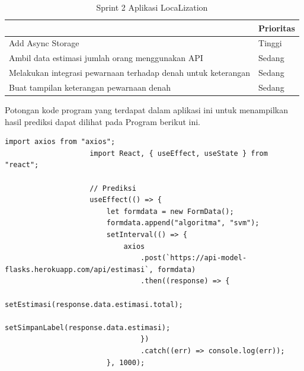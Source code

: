 \begin{enumerate}[1.]
	      \begin{table}[H]
		      \centering
		      \caption{Sprint 2 Aplikasi LocaLization}
		      \label{LocaLization-sprint-2}
		      \begin{tabular}{|l|l|}
			      \hline
			      \rowcolor[HTML]{CBCEFB}
			      \multicolumn{1}{|c|}{\cellcolor[HTML]{CBCEFB}Item}            & \multicolumn{1}{c|}{\cellcolor[HTML]{CBCEFB}Prioritas} \\ \hline
			      Add Async Storage                                             & Tinggi                                                 \\ \hline
			      Ambil data estimasi jumlah orang menggunakan API              & Sedang                                                 \\ \hline
			      Melakukan integrasi pewarnaan terhadap denah untuk keterangan & Sedang                                                 \\ \hline
			      Buat tampilan keterangan pewarnaan denah                      & Sedang                                                 \\ \hline
		      \end{tabular}
	      \end{table}

	      Potongan kode program yang terdapat dalam aplikasi ini untuk menampilkan hasil prediksi dapat dilihat pada Program berikut ini.

	      \vspace{0.4cm}
	      \begin{lstlisting}[label=programKNNDosen]
					import axios from "axios";
					import React, { useEffect, useState } from "react";
					
					// Prediksi
					useEffect(() => {
						let formdata = new FormData();
						formdata.append("algoritma", "svm");
						setInterval(() => {
							axios
								.post(`https://api-model-flasks.herokuapp.com/api/estimasi`, formdata)
								.then((response) => {
									setEstimasi(response.data.estimasi.total);
									setSimpanLabel(response.data.estimasi);
								})
								.catch((err) => console.log(err));
						}, 1000);
				

\end{lstlisting}
\end{enumerate}
